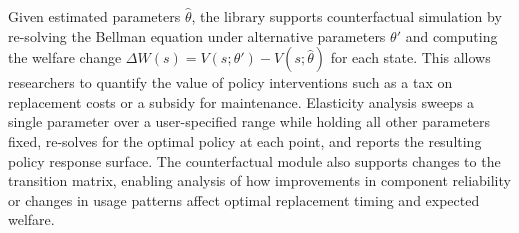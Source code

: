 Given estimated parameters $\hat\theta$, the library supports counterfactual simulation by re-solving the Bellman equation under alternative parameters $\theta'$ and computing the welfare change $\Delta W(s) = V(s;\theta') - V(s;\hat\theta)$ for each state. This allows researchers to quantify the value of policy interventions such as a tax on replacement costs or a subsidy for maintenance. Elasticity analysis sweeps a single parameter over a user-specified range while holding all other parameters fixed, re-solves for the optimal policy at each point, and reports the resulting policy response surface. The counterfactual module also supports changes to the transition matrix, enabling analysis of how improvements in component reliability or changes in usage patterns affect optimal replacement timing and expected welfare.
